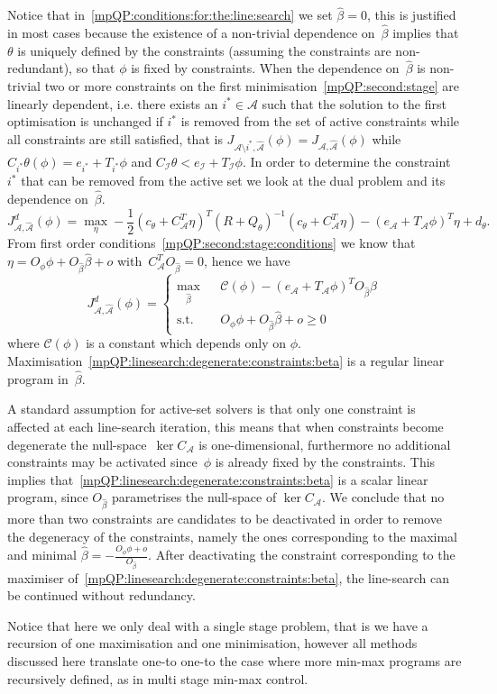 Notice that in~\eqref{mpQP:conditions:for:the:line:search} we set $\hat \beta=0$, this is justified in
most cases because the existence of a non-trivial dependence on~$\hat\beta$ implies that $\theta$ is uniquely
defined by the constraints (assuming the constraints are non-redundant), so that $\phi$ is fixed by constraints.
%
When the dependence on~$\hat\beta$ is non-trivial two or more constraints on the first minimisation~\eqref{mpQP:second:stage}
are linearly dependent,
% 
i.e. there exists an $i^\ast\in\mathcal A$ such that the solution
to the first optimisation is unchanged if $i^\ast$ is removed from the set of active constraints while all
constraints are still satisfied, that is $J_{\mathcal A\setminus i^\ast,\hat{\mathcal A}}(\phi)=J_{\mathcal A,\hat{\mathcal A}}(\phi)$
while $C_{i^\ast}\theta(\phi)=e_{i^\ast}+T_{i^\ast}\phi$ and $C_{\mathcal I}\theta<e_{\mathcal I}+T_{\mathcal I}\phi$.
%
In order to determine the constraint~$i^\ast$ that can be removed from the active set we look at the dual
problem and its dependence on~$\hat\beta$.
%
\begin{equation}
	J_{\mathcal A,\hat{\mathcal A}}^d(\phi) = \max_\eta -\frac{1}{2} (c_\theta+C^T_{\mathcal A}\eta)^T(R+Q_\theta)^{-1}
	(c_\theta+C^T_{\mathcal A}\eta)-(e_{\mathcal A}+T_{\mathcal A}\phi)^T \eta+ d_\theta.
\end{equation}
%
From first order conditions~\eqref{mpQP:second:stage:conditions} we know that 
$\eta = O_\phi\phi+O_{\hat\beta}\hat\beta+o$ with~$C^T_{\mathcal A}O_{\hat\beta}=0$, hence we have
%
\begin{equation}\label{mpQP:linesearch:degenerate:constraints:beta}
	J_{\mathcal A,\hat{\mathcal A}}^d(\phi) = \left\{\begin{array}{rcl}
	\max_{\hat\beta}& &\mathcal C(\phi) -(e_{\mathcal A}+T_{\mathcal A} \phi)^TO_{\hat\beta}\hat\beta\\
	\text{s.t.}& &O_\phi\phi+O_{\hat\beta}\hat\beta+o\geq0
	\end{array}\right.
\end{equation}
where $\mathcal C(\phi)$ is a constant which depends only on $\phi$. 
%
Maximisation~\eqref{mpQP:linesearch:degenerate:constraints:beta} is a regular linear program in~$\hat\beta$.


A standard assumption for active-set solvers is that only one constraint is affected at each line-search
iteration, this means that when constraints become degenerate the null-space~$\ker C_{\mathcal A}$ is
one-dimensional, furthermore no additional constraints may be activated since~$\phi$ is already fixed by
the constraints.
%
This implies that~\eqref{mpQP:linesearch:degenerate:constraints:beta} is a scalar linear program, since
$O_{\hat\beta}$ parametrises the null-space of $\ker C_{\mathcal A}$.
%
We conclude that no more than two constraints are candidates to be deactivated in order to remove the degeneracy
of the constraints, namely the ones corresponding to the maximal and minimal $\hat\beta=
-\frac{O_\phi\phi+o}{O_{\hat\beta}}$.
%
After deactivating the constraint corresponding to the maximiser of~\eqref{mpQP:linesearch:degenerate:constraints:beta},
the line-search can be continued without redundancy.


Notice that here we only deal with a single stage problem, that is we have a recursion of one
maximisation and one minimisation, however all methods discussed here translate one-to one-to the
case where more min-max programs are recursively defined, as in multi stage min-max control.